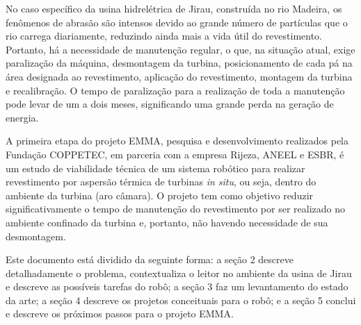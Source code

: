 No caso específico da usina hidrelétrica de Jirau, construída no rio Madeira,
os fenômenos de abrasão são intensos devido ao grande número
de partículas que o rio carrega diariamente, reduzindo ainda mais a vida útil do
revestimento.
Portanto, há a necessidade de manutenção regular, o que, na situação atual,
exige paralização da máquina, desmontagem da turbina, posicionamento de cada pá
na área designada ao revestimento, aplicação do revestimento, montagem da
turbina e recalibração. O tempo de paralização para a realização de
toda a manutenção pode levar de um a dois meses, significando uma grande perda
na geração de energia. 

A primeira etapa do projeto EMMA, pesquisa e desenvolvimento
realizados pela Fundação COPPETEC, em parceria com a empresa Rijeza, ANEEL e
ESBR, é um estudo de viabilidade técnica de um sistema robótico para realizar
revestimento por aspersão térmica de turbinas \textit{in situ}, ou seja, dentro
do ambiente da turbina (aro câmara). O projeto tem como objetivo reduzir
significativamente o tempo de manutenção do revestimento por ser realizado no
ambiente confinado da turbina e, portanto, não havendo necessidade de sua
desmontagem.

Este documento está dividido da seguinte forma: a seção 2 descreve
detalhadamente o problema, contextualiza o leitor no ambiente da usina de
Jirau e descreve as possíveis tarefas do robô; a seção 3 faz um levantamento do
estado da arte; a seção 4 descreve os projetos conceituais para o robô; e a
seção 5 conclui e descreve os próximos passos para o projeto EMMA. 
